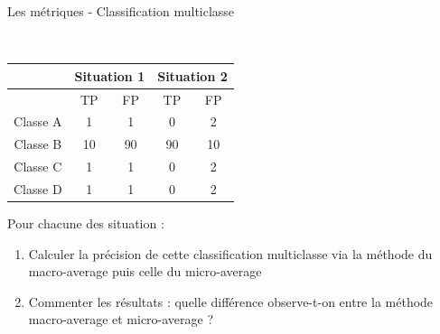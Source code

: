 \documentclass[10pt]{beamer}
\begin{document}
\begin{frame}{Les métriques - Classification multiclasse}

	
	\begin{center}
	 \\[1em]
	\begin{table}[h!]
		\centering
		\begin{tabular}{|c|c|c|c|c|}
			\hline
			& \multicolumn{2}{c|}{Situation 1} & \multicolumn{2}{c|}{Situation 2} \\ \hline
			& TP&FP&TP&FP\\\hline
			 Classe A & 1 & 1  & 0 &2  \\
			 Classe B & 10 &90  & 90 & 10  \\
			  Classe C& 1 & 1  & 0 &2  \\
			   Classe D & 1 & 1  & 0 &2  \\
			 \hline
		\end{tabular}
	\end{table}
\end{center}

\vspace*{1em}
Pour chacune des situation : \\[0.5em]
\begin{enumerate}
	\item Calculer la précision de cette classification multiclasse via la méthode du macro-average puis celle du micro-average\\[0.3em]
	\item Commenter les résultats : quelle différence observe-t-on entre la méthode macro-average et  micro-average ?
\end{enumerate}

\vspace{2em}

\end{frame}

\
\end{document}

